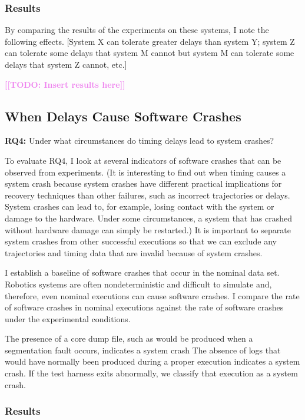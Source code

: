\documentclass[conference]{IEEEtran}
\newcommand{\todo}[1]{\textcolor{violet}{{\bfseries [[TODO: #1]]}}}
\begin{document}
\subsubsection{Results}


By comparing the results of the experiments on these systems, I note the following effects. [System X can tolerate greater delays than system Y; system Z can tolerate some delays that system M cannot but system M can tolerate some delays that system Z cannot, etc.]

\todo{Insert results here}


\subsection{When Delays Cause Software Crashes}
\label{sec:timing-methodology-RQ-crash}

\textbf{RQ4:} Under what circumstances do timing delays lead to system crashes?

To evaluate RQ4, I look at several indicators of software crashes that can be observed from experiments.
(It is interesting to find out when timing causes a system crash because system crashes have different practical implications for recovery techniques than other failures, such as incorrect trajectories or delays. System crashes can lead to, for example, losing contact with the system or damage to the hardware. Under some circumstances, a system that has crashed without hardware damage can simply be restarted.)
It is important to separate system crashes from other successful executions so that we can exclude any trajectories and timing data that are invalid because of system crashes.

I establish a baseline of software crashes that occur in the nominal data set. Robotics systems are often nondeterministic and difficult to simulate and,
therefore, even nominal executions can cause software crashes.
I compare the rate of software crashes in nominal executions against the rate of software crashes under the experimental conditions.

The presence of a core dump file, such as would be produced when a segmentation fault occurs, indicates a system crash
The absence of logs that would have normally been produced during a proper execution indicates a system crash.
If the test harness exits abnormally, we classify that execution as a system crash.

\subsubsection{Results}
\end{document}
